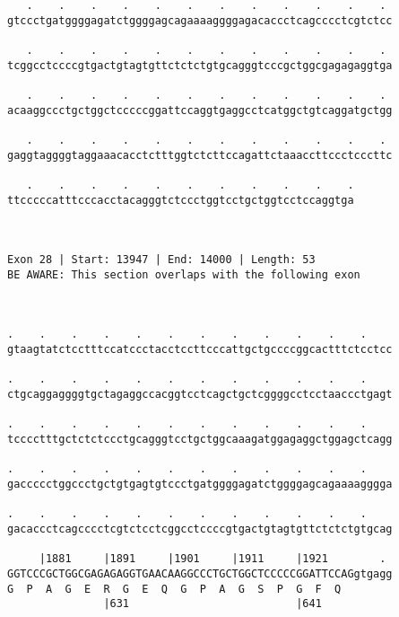 \documentclass{article}
\begin{document}
\begin{Verbatim}
   .    .    .    .    .    .    .    .    .    .    .    . 
gtccctgatggggagatctggggagcagaaaaggggagacaccctcagcccctcgtctcc
                                                            
   .    .    .    .    .    .    .    .    .    .    .    . 
tcggcctccccgtgactgtagtgttctctctgtgcagggtcccgctggcgagagaggtga
                                                            
   .    .    .    .    .    .    .    .    .    .    .    . 
acaaggccctgctggctcccccggattccaggtgaggcctcatggctgtcaggatgctgg
                                                            
   .    .    .    .    .    .    .    .    .    .    .    . 
gaggtaggggtaggaaacacctctttggtctcttccagattctaaaccttccctcccttc
                                                            
   .    .    .    .    .    .    .    .    .    .    .
ttcccccatttcccacctacagggtctccctggtcctgctggtcctccaggtga
                                                      
                                                      
 
Exon 28 | Start: 13947 | End: 14000 | Length: 53
BE AWARE: This section overlaps with the following exon



.    .    .    .    .    .    .    .    .    .    .    .    
gtaagtatctcctttccatccctacctccttcccattgctgccccggcactttctcctcc
                                                            
.    .    .    .    .    .    .    .    .    .    .    .    
ctgcaggaggggtgctagaggccacggtcctcagctgctcggggcctcctaaccctgagt
                                                            
.    .    .    .    .    .    .    .    .    .    .    .    
tcccctttgctctctccctgcagggtcctgctggcaaagatggagaggctggagctcagg
                                                            
.    .    .    .    .    .    .    .    .    .    .    .    
gaccccctggccctgctgtgagtgtccctgatggggagatctggggagcagaaaagggga
                                                            
.    .    .    .    .    .    .    .    .    .    .    .    
gacaccctcagcccctcgtctcctcggcctccccgtgactgtagtgttctctctgtgcag
                                                            
     |1881     |1891     |1901     |1911     |1921        . 
GGTCCCGCTGGCGAGAGAGGTGAACAAGGCCCTGCTGGCTCCCCCGGATTCCAGgtgagg
G  P  A  G  E  R  G  E  Q  G  P  A  G  S  P  G  F  Q        
               |631                          |641           
  

\end{Verbatim}
\end{document}
